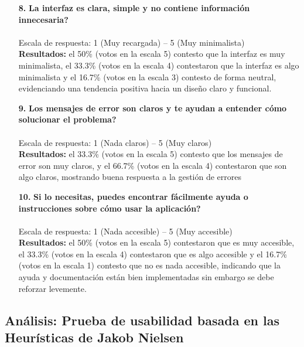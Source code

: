 \begin{enumerate}
\item[\textbf{8.}] \textbf{\textquestiondown La interfaz es clara, simple y no contiene información innecesaria?} \\\\
Escala de respuesta: 1 (Muy recargada) -- 5 (Muy minimalista)\\

\textbf{Resultados: } el 50\% (votos en la escala 5) contesto que la interfaz es muy minimalista, el 33.3\% (votos en la escala 4) contestaron que la interfaz es algo minimalista y el 16.7\% (votos en la escala 3) contesto de forma neutral, evidenciando una tendencia positiva hacia un diseño claro y funcional.
\\

\item[\textbf{9.}] \textbf{\textquestiondown Los mensajes de error son claros y te ayudan a entender cómo solucionar el problema?} \\\\
Escala de respuesta: 1 (Nada claros) -- 5 (Muy claros)\\

\textbf{Resultados: } el 33.3\% (votos en la escala 5) contesto que los mensajes de error son muy claros, y el 66.7\% (votos en la escala 4) contestaron que son algo claros,  mostrando buena respuesta a la gestión de errores
 \\
 
\item[\textbf{10.}] \textbf{\textquestiondown Si lo necesitas, puedes encontrar fácilmente ayuda o instrucciones sobre cómo usar la aplicación?} \\\\
Escala de respuesta: 1 (Nada accesible) -- 5 (Muy accesible)\\


\textbf{Resultados: } el 50\% (votos en la escala 5) contestaron que es muy accesible, el 33.3\% (votos en la escala 4) contestaron que es algo accesible y el 16.7\% (votos en la escala 1)  contesto que no es nada accesible, indicando que la ayuda y documentación están bien implementadas sin embargo se debe reforzar levemente.
\\
\end{enumerate}


\subsection{Análisis: Prueba de usabilidad basada en las Heurísticas de Jakob Nielsen}

